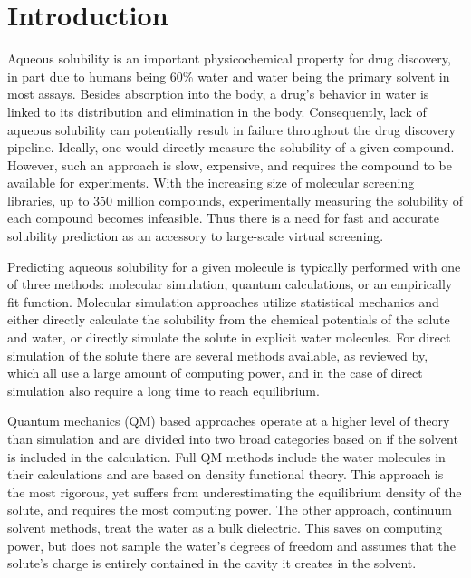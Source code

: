 \documentclass[journal=jcim,manuscript=applicationnotes]{achemso}
\begin{document}

\section{Introduction}
Aqueous solubility is an important physicochemical property for drug discovery, in part due to humans being 60\% water\cite{HumanWater} and water being the primary solvent in most assays. 
Besides absorption into the body, a drug's behavior in water is linked to its distribution and elimination in the body.
Consequently, lack of aqueous solubility can potentially result in failure throughout the drug discovery pipeline.\cite{LIPINSKI1997,DI2006446,EKINS2002305}
Ideally, one would directly measure the solubility of a given compound.
However, such an approach is slow, expensive, and requires the compound to be available for experiments.
With the increasing size of molecular screening libraries, up to 350 million compounds,\cite{NatureVS} experimentally measuring the solubility of each compound becomes infeasible.
Thus there is a need for fast and accurate solubility prediction as an accessory to large-scale virtual screening.

Predicting aqueous solubility for a given molecule is typically performed with one of three methods: molecular simulation, quantum calculations, or an empirically fit function.
Molecular simulation approaches utilize statistical mechanics and either directly calculate the solubility from the chemical potentials of the solute and water\cite{denseStates}, or directly simulate the solute in explicit water molecules.
For direct simulation of the solute there are several methods available, as reviewed by\citet{solrev1}, which all use a large amount of computing power, and in the case of direct simulation also require a long time to reach equilibrium.

Quantum mechanics (QM) based approaches operate at a higher level of theory than simulation and are divided into two broad categories based on if the solvent is included in the calculation. 
Full QM methods include the water molecules in their calculations and are based on density functional theory\cite{solrev1}.
This approach is the most rigorous, yet suffers from underestimating the equilibrium density of the solute\cite{solrev1}, and requires the most computing power.
The other approach, continuum solvent methods, treat the water as a bulk dielectric.
This saves on computing power, but does not sample the water's degrees of freedom and assumes that the solute's charge is entirely contained in the cavity it creates in the solvent.
\end{document}
